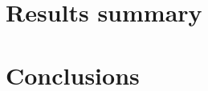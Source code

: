 \documentclass[a4paper]{article}
\begin{document}


    \section{Results summary}
    \label{sec:results}

    \section{Conclusions}
    \label{sec:conclusions}


    
    


\end{document}
